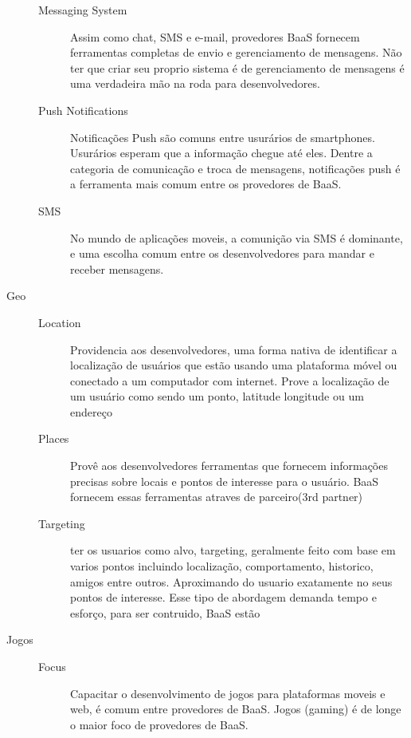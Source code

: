 \begin{description}
\begin{description}
				\item[Messaging System] { Assim como chat, SMS e e-mail, provedores BaaS fornecem ferramentas completas de envio e gerenciamento de mensagens. Não ter que criar seu proprio sistema é de gerenciamento de mensagens é uma verdadeira mão na roda para desenvolvedores.}
				
				\item[Push Notifications] { Notificações Push são comuns entre usurários de smartphones. Usurários esperam que a informação chegue até eles. Dentre a categoria de comunicação e troca de mensagens, notificações push é a ferramenta mais comum entre os provedores de BaaS.}

				\item[SMS] { No mundo de aplicações moveis, a comunição via SMS é dominante, e uma escolha comum entre os desenvolvedores para mandar e receber mensagens.}
			\end{description}
		
		\item[Geo]
			\begin{description}
				\item[]
                \item[Location] { Providencia aos desenvolvedores, uma forma nativa de identificar a localização de usuários que estão usando uma plataforma móvel ou conectado a um computador com internet. Prove a localização de um usuário como sendo um ponto, latitude longitude ou um endereço}
				
				\item[Places] { Provê aos desenvolvedores ferramentas que fornecem informações precisas sobre locais e pontos de interesse para o usuário. BaaS fornecem essas ferramentas atraves de parceiro(3rd partner)}
				
				\item[Targeting] { ter os usuarios como alvo, targeting, geralmente feito com base em varios pontos incluindo localização, comportamento, historico, amigos entre outros. Aproximando do usuario exatamente no seus pontos de interesse. Esse tipo de abordagem demanda tempo e esforço, para ser contruido, BaaS estão }
			\end{description}
		
		\item[Jogos]
			\begin{description}
				\item[]
                \item[Focus] { Capacitar o desenvolvimento de jogos para plataformas moveis e web, é comum entre provedores de BaaS. Jogos (gaming) é de longe o maior foco de provedores de BaaS.}
			\end{description}


\end{description}
